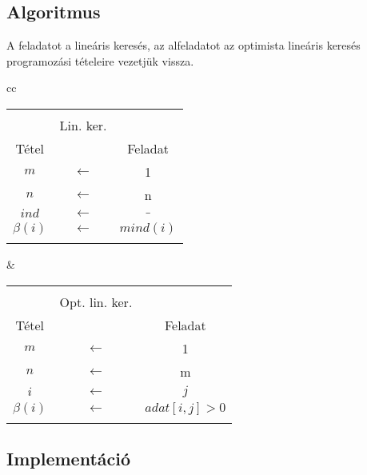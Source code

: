 \documentclass[a4paper]{article}
\begin{document}
    \subsection{Algoritmus}
      A feladatot a lineáris keresés, az alfeladatot az optimista lineáris keresés programozási tételeire vezetjük vissza.
      \begin{tabular}{cc}
          \begin{minipage}{.5\linewidth}
            \begin{tabular}{ccc}
              & & \\
              & Lin. ker. & \\
              \midrule
              Tétel & & Feladat \\
              \midrule
              $m$ & $\leftarrow$ & 1 \\
              $n$ & $\leftarrow$ & n \\
              $ind$ & $\leftarrow$ & $\_$ \\
              $\beta (i)$ & $\leftarrow$ & $mind(i)$ \\
              \midrule
              & & \\
            \end{tabular}
            
          \end{minipage} &

          \begin{minipage}{.5\linewidth}
            \begin{tabular}{ccc}
              & & \\
              & Opt. lin. ker. & \\
              \midrule
              Tétel & & Feladat \\
              \midrule
              $m$ & $\leftarrow$ & 1 \\
              $n$ & $\leftarrow$ & m \\
              $i$ & $\leftarrow$ & $j$ \\
              $\beta (i)$ & $\leftarrow$ & $adat[i,j]>0$ \\
              \midrule
              & &  \\
            \end{tabular}
            
          \end{minipage}
      \end{tabular}
    \subsection{Implementáció}
\end{document}
